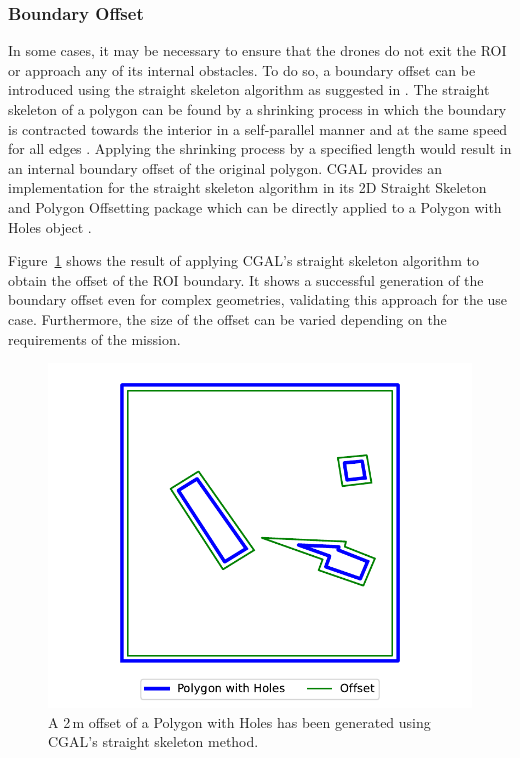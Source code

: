 
\subsubsection{Boundary Offset}

In some cases, it may be necessary to ensure that the drones do not exit the \gls{ROI} or approach any of its internal obstacles. To do so, a boundary offset can be introduced using the straight skeleton algorithm as suggested in \cite{shahid2024cpp}. The straight skeleton of a polygon can be found by a shrinking process in which the boundary is contracted towards the interior in a self-parallel manner and at the same speed for all edges \cite{aichholzer1996ss}. Applying the shrinking process by a specified length would result in an internal boundary offset of the original polygon. \gls{CGAL} provides an implementation for the straight skeleton algorithm in its 2D Straight Skeleton and Polygon Offsetting package which can be directly applied to a Polygon with Holes object \cite{cgal2024ss}.

Figure~\ref{fig:msp_straight_skeleton} shows the result of applying \gls{CGAL}'s straight skeleton algorithm to obtain the offset of the \gls{ROI} boundary. It shows a successful generation of the boundary offset even for complex geometries, validating this approach for the use case. Furthermore, the size of the offset can be varied depending on the requirements of the mission. 

\begin{figure}[h!]
    \centering
    \includegraphics[width=0.6\linewidth]{figs/Jihwan/Polygon Offset with Straight Skeleton.pdf}
    \caption[Offset of ROI using Straight Skeleton]
    {A 2\,m offset of a Polygon with Holes has been generated using \gls{CGAL}'s straight skeleton method.}
    \label{fig:msp_straight_skeleton}
\end{figure}

